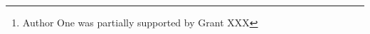 \author{Atilla Özgür$^1$\thanks{Author One was partially supported by Grant XXX} \and Author Two$^2$ \and Author Three$^1$}


